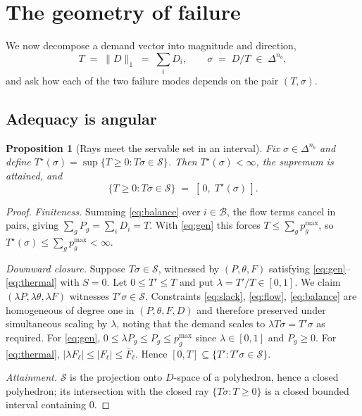 \documentclass[11pt,a4paper]{article}
\theoremstyle{definition}
\theoremstyle{plain}
\newtheorem{proposition}[definition]{Proposition}
\theoremstyle{remark}
\newcommand{\simplex}{\Delta}
\begin{document}
\section{The geometry of failure}\label{sec:geometry}

We now decompose a demand vector into magnitude and direction,
\[
T \;=\; \lVert D \rVert_1 \;=\; \sum_i D_i,
\qquad
\sigma \;=\; D / T \;\in\; \simplex^{n_b},
\]
and ask how each of the two failure modes depends on the pair $(T,\sigma)$.

\subsection{Adequacy is angular}

\begin{proposition}[Rays meet the servable set in an interval]\label{prop:ray}
Fix $\sigma \in \simplex^{n_b}$ and define
$T^\star(\sigma) = \sup\{T \ge 0 : T\sigma \in \mathcal{S}\}$. Then
$T^\star(\sigma) < \infty$, the supremum is attained, and
\[
\{T \ge 0 : T\sigma \in \mathcal{S}\} \;=\; [\,0,\; T^\star(\sigma)\,].
\]
\end{proposition}

\begin{proof}
\emph{Finiteness.} Summing \eqref{eq:balance} over $i\in\mathcal{B}$, the flow
terms cancel in pairs, giving $\sum_g P_g = \sum_i D_i = T$. With
\eqref{eq:gen} this forces $T \le \sum_g p^{\max}_g$, so
$T^\star(\sigma) \le \sum_g p^{\max}_g < \infty$.

\emph{Downward closure.} Suppose $T\sigma \in \mathcal{S}$, witnessed by
$(P,\theta,F)$ satisfying \eqref{eq:gen}--\eqref{eq:thermal} with $S=0$. Let
$0 \le T' \le T$ and put $\lambda = T'/T \in [0,1]$. We claim
$(\lambda P, \lambda\theta, \lambda F)$ witnesses $T'\sigma \in \mathcal{S}$.
Constraints \eqref{eq:slack}, \eqref{eq:flow}, \eqref{eq:balance} are homogeneous
of degree one in $(P,\theta,F,D)$ and therefore preserved under simultaneous
scaling by $\lambda$, noting that the demand scales to $\lambda T\sigma = T'\sigma$
as required. For \eqref{eq:gen}, $0 \le \lambda P_g \le P_g \le p^{\max}_g$ since
$\lambda\in[0,1]$ and $P_g \ge 0$. For \eqref{eq:thermal},
$|\lambda F_\ell| \le |F_\ell| \le \bar F_\ell$. Hence
$[0,T] \subseteq \{T' : T'\sigma\in\mathcal{S}\}$.

\emph{Attainment.} $\mathcal{S}$ is the projection onto $D$-space of a polyhedron,
hence a closed polyhedron; its intersection with the closed ray
$\{T\sigma : T\ge 0\}$ is a closed bounded interval containing $0$.
\end{proof}
\end{document}
